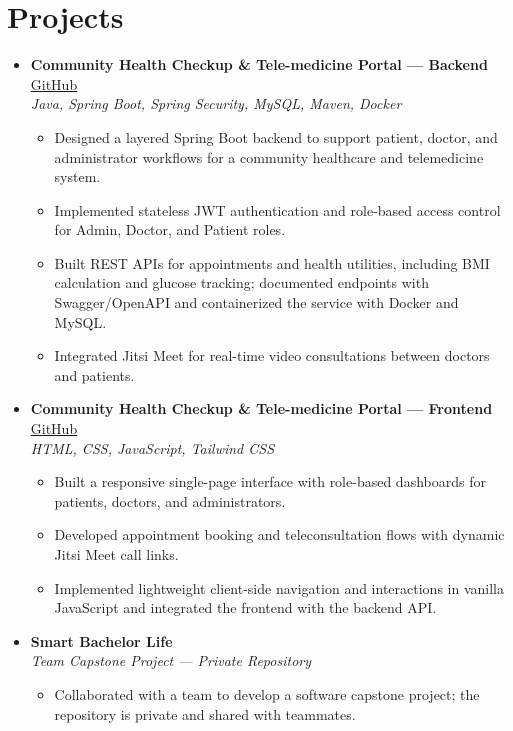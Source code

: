 \documentclass[11pt,a4paper]{article}
\begin{document}
\section*{Projects}
\begin{itemize}[label=\textbullet]
    \item \textbf{Community Health Checkup \& Tele-medicine Portal --- Backend} \hfill
    \href{https://github.com/pranta2003/Community_Health_Checkup_and_Tele-medicine_Portal-Backend-Part}{GitHub}\\
    \textit{Java, Spring Boot, Spring Security, MySQL, Maven, Docker}
    \begin{itemize}
        \item Designed a layered Spring Boot backend to support patient, doctor, and administrator workflows for a community healthcare and telemedicine system.
        \item Implemented stateless JWT authentication and role-based access control for Admin, Doctor, and Patient roles.
        \item Built REST APIs for appointments and health utilities, including BMI calculation and glucose tracking; documented endpoints with Swagger/OpenAPI and containerized the service with Docker and MySQL.
        \item Integrated Jitsi Meet for real-time video consultations between doctors and patients.
    \end{itemize}

    \item \textbf{Community Health Checkup \& Tele-medicine Portal --- Frontend} \hfill
    \href{https://github.com/pranta2003/Community_Health_Checkup_and_Tele-medicine_Portal-Frontend_Part-}{GitHub}\\
    \textit{HTML, CSS, JavaScript, Tailwind CSS}
    \begin{itemize}
        \item Built a responsive single-page interface with role-based dashboards for patients, doctors, and administrators.
        \item Developed appointment booking and teleconsultation flows with dynamic Jitsi Meet call links.
        \item Implemented lightweight client-side navigation and interactions in vanilla JavaScript and integrated the frontend with the backend API.
    \end{itemize}

    \item \textbf{Smart Bachelor Life}\\
    \textit{Team Capstone Project --- Private Repository}
    \begin{itemize}
        \item Collaborated with a team to develop a software capstone project; the repository is private and shared with teammates.
    \end{itemize}


\end{itemize}
\end{document}
